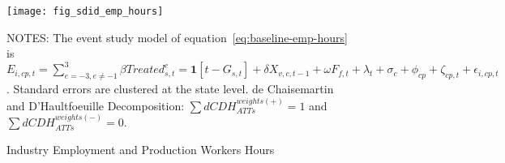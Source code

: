 \begin{figure}[H]
    \centering
    \texttt{[image: fig\_sdid\_emp\_hours]}
    \caption{Industry Employment and Production Workers Hours}
    \label{fig:baseline-employment-hours}
    \begin{minipage}{18cm}
        \vspace{0.05in}
        NOTES: The event study model of equation~\ref{eq:baseline-emp-hours} is $E_{i,cp,t} = \sum_{{e = -3},{e \neq -1}}^{3} \beta Treated_{s,t}^e = \textbf{1}[t - G_{s,t}] + \delta X_{v,c,t-1} + \omega F_{f,t} + \lambda_{t} + \sigma_{c} + \phi_{cp} + \zeta_{cp,t} + \epsilon_{i,cp,t}$. Standard errors are clustered at the state level. de Chaisemartin and D'Haultfoeuille Decomposition: $\sum dCDH_{ATTs}^{weights(+)} = 1$ and $\sum dCDH_{ATTs}^{weights(-)} = 0$.
    \end{minipage}
\end{figure}